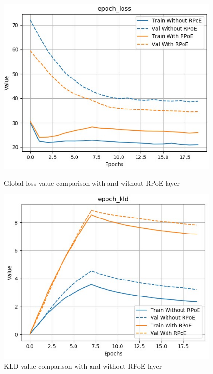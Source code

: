 \documentclass[12pt]{report}
\begin{document}
\begin{figure}[htbp]
    \begin{minipage}{0.5\textwidth}
        \begin{center}
            \includegraphics[width=\textwidth]{images/experiences/rpoe-rnn/loss-comparison-rpoe.jpg}
            \caption{Global loss value comparison with and without RPoE layer}
            \label{fig:loss-comparison-rpoe}
        \end{center}
    \end{minipage} \hfill
    \begin{minipage}{0.5 \textwidth}
        \begin{center}
            \includegraphics[width=\textwidth]{images/experiences/rpoe-rnn/kld-comparison-rpoe.jpg}
            \caption{KLD value comparison with and without RPoE layer}
            \label{fig:kld-comparison-rpoe}
        \end{center}
    \end{minipage}
\end{figure}
\end{document}
